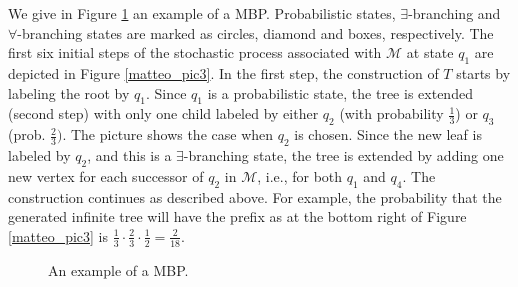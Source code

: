 We give in Figure \ref{matteo_pic1} an example of a MBP. Probabilistic states, $\exists$-branching and $\forall$-branching states are marked as circles, diamond and boxes, respectively.  The first six initial steps of the stochastic process associated with $\mathcal{M}$ at state $q_1$ are depicted in Figure \ref{matteo_pic3}.
In the first step, the construction of $T$ starts by labeling the root by $q_1$. Since $q_1$ is a probabilistic state, the tree is extended (second step) with only one child labeled by either $q_2$ (with probability $\frac{1}{3}$) or $q_3$ (prob. $\frac{2}{3})$. The picture  shows the case when $q_2$ is chosen. Since the new leaf is labeled by $q_2$, and this is a $\exists$-branching state, the tree is extended by adding one new vertex for each successor of $q_2$ in $\mathcal{M}$, i.e., for both $q_1$ and $q_4$. The construction continues as described above. For example, the probability that the generated infinite tree will have the prefix as at the bottom right of Figure \ref{matteo_pic3} is $\frac{1}{3}\cdot \frac{2}{3}\cdot \frac{1}{2}\!=\!\frac{2}{18}$.
\begin{figure}[H] 
\centering
{}



\caption{An example of a MBP.}
\label{matteo_pic1}
\end{figure}
 
